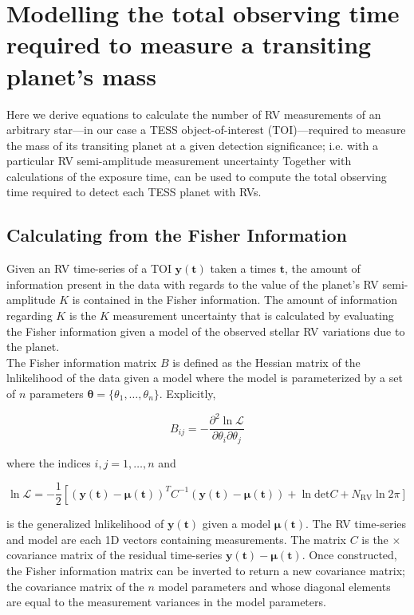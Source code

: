 \section{Modelling the total observing time required to measure a transiting planet's mass} \label{RVFCsect:model}
Here we derive equations to calculate the number of RV measurements \nrv{,}
of an arbitrary star---in our case a TESS object-of-interest (TOI)---required to measure the mass of
its transiting planet at a given
detection significance; i.e. with a particular RV semi-amplitude measurement uncertainty 
Together with calculations of the exposure time, \nrv{} can be used to
compute the total observing time required to detect each TESS planet with RVs.

\subsection{Calculating \sigK{} from the Fisher Information} \label{RVFCsect:fisher}
Given an RV time-series of a TOI $\mathbf{y}(\mathbf{t})$ taken a times $\mathbf{t}$,
the amount of information present in the data with regards to the value of
the planet's RV semi-amplitude $K$ is contained in the Fisher information. The amount of
information regarding $K$ is the $K$ measurement uncertainty \sigK{,} that is calculated by
evaluating the Fisher information given a model of the observed stellar RV variations due to the
planet. \\

The Fisher
information matrix $B$ is defined as the Hessian matrix of the lnlikelihood of the data given a model
where the model is parameterized by a set of $n$ parameters $\boldsymbol{\theta}=\{\theta_1,\dots,\theta_n\}$.
Explicitly,

\begin{equation}
  B_{ij} = - \frac{\partial^2 \ln{\mathcal{L}}}{\partial \theta_i \partial \theta_j}
  \label{RVFCeq:fisher}
\end{equation}

\noindent where the indices $i,j=1,\dots,n$ and

\begin{equation}
  \ln{\mathcal{L}} = -\frac{1}{2} \left[(\mathbf{y}(\mathbf{t})-\boldsymbol{\mu}(\mathbf{t}))^T C^{-1} \right.
    (\mathbf{y}(\mathbf{t})-\boldsymbol{\mu}(\mathbf{t})) + \ln{\text{det} C}
    + \left.N_{\text{RV}} \ln{2\pi} \right]
  \label{RVFCeq:lnl}
\end{equation}
  
\noindent is the generalized lnlikelihood of $\mathbf{y}(\mathbf{t})$ given a model
$\boldsymbol{\mu}(\mathbf{t})$. The RV time-series and model are each 1D vectors containing
\nrv{} measurements. The matrix $C$ is the \nrv{} $\times$ \nrv{} covariance matrix of the residual
time-series $\mathbf{y}(\mathbf{t})-\boldsymbol{\mu}(\mathbf{t})$. Once constructed,
the Fisher information matrix can be inverted to return a new covariance matrix; the covariance matrix
of the $n$ model parameters and whose diagonal elements are equal to the measurement variances in the
model parameters. \\

